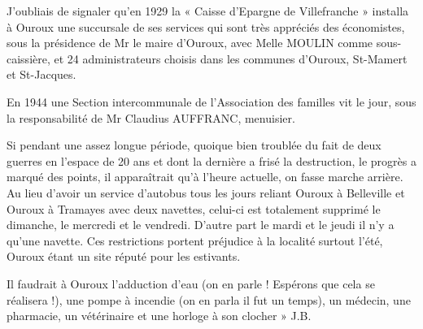 J'oubliais de signaler qu'en 1929 la « Caisse d'Epargne de Villefranche » installa à Ouroux une succursale de ses services qui sont très appréciés des économistes, sous la présidence de Mr le maire d'Ouroux, avec Melle MOULIN comme sous-caissière, et 24 administrateurs choisis dans les communes d'Ouroux, St-Mamert et St-Jacques.

En 1944 une Section intercommunale de l'Association des familles vit le jour, sous la responsabilité de Mr Claudius AUFFRANC, menuisier.

Si pendant une assez longue période, quoique bien troublée du fait de deux guerres en l'espace de 20 ans et dont la dernière a frisé la destruction, le progrès a marqué des points, il apparaîtrait qu'à l'heure actuelle, on fasse marche arrière. Au lieu d'avoir un service d'autobus tous les jours reliant Ouroux à Belleville et Ouroux à Tramayes avec deux navettes, celui-ci est totalement supprimé le dimanche, le mercredi et le vendredi. D'autre part le mardi et le jeudi il n'y a qu'une navette. Ces restrictions portent préjudice à la localité surtout l'été, Ouroux étant un site réputé pour les estivants.

Il faudrait à Ouroux l'adduction d'eau (on en parle ! Espérons que cela se réalisera !), une pompe à incendie (on en parla il fut un temps), un médecin, une pharmacie, un vétérinaire et une horloge à son clocher » J.B.
